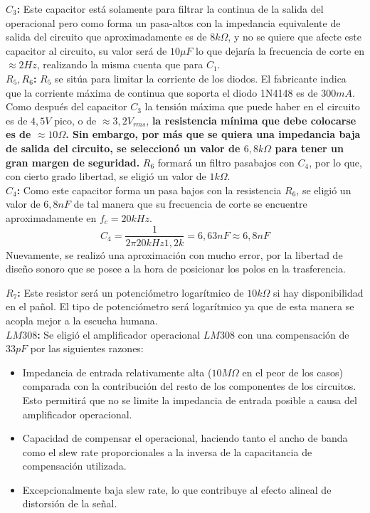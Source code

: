 \textbf{$C_3$:} Este capacitor está solamente para filtrar la continua de la salida del operacional pero como forma un pasa-altos con la impedancia equivalente de salida del circuito que aproximadamente es de $8k\Omega$, y no se quiere que afecte este capacitor al circuito, su valor será de $10\mu F$ lo que dejaría la frecuencia de corte en $\approx 2Hz$, realizando la misma cuenta que para $C_1$.\\

\textbf{$R_5, R_6$:} $R_5$ se sitúa para limitar la corriente de los diodos. El fabricante indica que la corriente máxima de continua que soporta el diodo 1N4148 es de $300mA$. Como después del capacitor $C_3$ la tensión máxima que puede haber en el circuito es de $4,5V$ pico, o de $\approx 3,2V_{rms}$, \textbf{la resistencia mínima que debe colocarse es de $\approx 10\Omega$. Sin embargo, por más que se quiera una impedancia baja de salida del circuito, se seleccionó un valor de $6,8k\Omega$ para tener un gran margen de seguridad.} $R_6$ formará un filtro pasabajos con $C_4$, por lo que, con cierto grado libertad, se eligió un valor de $1k\Omega$.\\

\textbf{$C_4$:} Como este capacitor forma un pasa bajos con la resistencia $R_6$, se eligió un valor de $6,8nF$ de tal manera que su frecuencia de corte se encuentre aproximadamente en $f_c = 20kHz$.
\[ C_4 = \frac{1}{2\pi 20kHz 1,2k} = 6,63nF \approx 6,8nF\]
Nuevamente, se realizó una aproximación con mucho error, por la libertad de diseño sonoro que se posee a la hora de posicionar los polos en la trasferencia.

\textbf{$R_7$:} Este resistor será un potenciómetro logarítmico de $10k\Omega$ si hay disponibilidad en el pañol. El tipo de potenciómetro será logarítmico ya que de esta manera se acopla mejor a la escucha humana.\\

\textbf{$LM308$:} Se eligió el amplificador operacional $LM308$ con una compensación de $33pF$ por las siguientes razones:

\begin{itemize}
\item Impedancia de entrada relativamente alta ($10M\Omega$ en el peor de los casos) comparada con la contribución del resto de los componentes de los circuitos. Esto permitirá que no se limite la impedancia de entrada posible a causa del amplificador operacional.
\item Capacidad de compensar el operacional, haciendo tanto el ancho de banda como el slew rate proporcionales a la inversa de la capacitancia de compensación utilizada.
\item Excepcionalmente baja slew rate, lo que contribuye al efecto alineal de distorsión de la señal.
\end{itemize}

